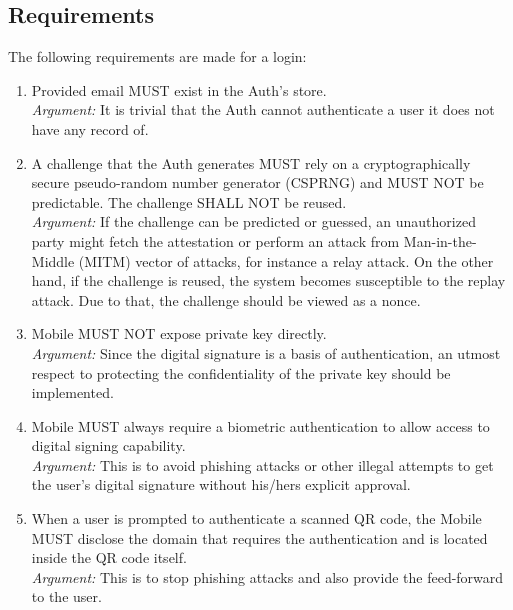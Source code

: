         

    \subsection{Requirements}
    The following requirements are made for a login:
        \begin{enumerate}
            \item Provided email MUST exist in the Auth's store.\\
            \textit{Argument:} It is trivial that the Auth cannot authenticate a user it does not have any record
                               of.         

            \item A challenge that the Auth generates MUST rely on a cryptographically secure pseudo-random number 
                  generator (CSPRNG) and MUST NOT be predictable. The challenge SHALL NOT be reused.\\
            \textit{Argument:} If the challenge can be predicted or guessed, an unauthorized party might fetch the
                               attestation or perform an attack from Man-in-the-Middle (MITM) vector of attacks, for
                               instance a relay attack. On the other hand, if the challenge is reused, the system 
                               becomes susceptible to the replay attack. Due to that, the challenge should be 
                               viewed as a nonce.

            \item Mobile MUST NOT expose private key directly.\\
            \textit{Argument:} Since the digital signature is a basis of authentication, an utmost respect to 
                               protecting the confidentiality of the private key should be implemented.

            \item Mobile MUST always require a biometric authentication to allow access to digital signing 
                  capability.\\        
            \textit{Argument:} This is to avoid phishing attacks or other illegal attempts to get the user's 
                               digital signature without his/hers explicit approval.

            \item When a user is prompted to authenticate a scanned QR code, the Mobile MUST disclose the domain that 
                  requires the authentication and is located inside the QR code itself.\\
            \textit{Argument:} This is to stop phishing attacks and also provide the feed-forward to the user.


\end{enumerate}
